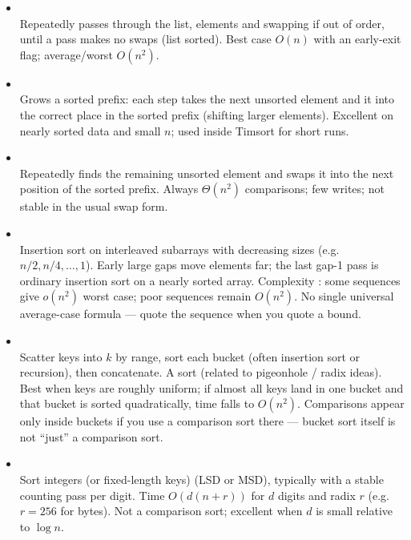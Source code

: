 \begin{itemize}
    \item \href{https://en.wikipedia.org/wiki/Bubble_sort}{} \\
    Repeatedly passes through the list,  elements and 
    swapping if out of order, until a pass makes no swaps (list sorted). Best case $O(n)$ 
    with an early-exit flag; average/worst $O(n^2)$.
    
    \item \href{https://en.wikipedia.org/wiki/Insertion_sort}{} \\
    Grows a sorted prefix: each step takes the next unsorted element and 
     it into the correct place in the sorted prefix (shifting larger 
    elements). Excellent on nearly sorted data and small $n$; used inside Timsort for short runs.
    
    \item \href{https://en.wikipedia.org/wiki/Selection_sort}{} \\
    Repeatedly finds the  remaining unsorted element and swaps it 
    into the next position of the sorted prefix. Always $\Theta(n^2)$ comparisons; 
    few writes; not stable in the usual swap form.
    
    \item \href{https://en.wikipedia.org/wiki/Shellsort}{} \\
    Insertion sort on interleaved subarrays with decreasing  sizes 
    (e.g.\ $n/2, n/4, \ldots, 1$). Early large gaps move elements far; the last gap-1 
    pass is ordinary insertion sort on a nearly sorted array. 
    Complexity : some sequences give 
    $o(n^2)$ worst case; poor sequences remain $O(n^2)$. No single universal 
    average-case formula --- quote the sequence when you quote a bound.
    
    \item \href{https://en.wikipedia.org/wiki/Bucket_sort}{} \\
    Scatter keys into $k$  by range, sort each bucket 
    (often insertion sort or recursion), then concatenate. A  
    sort (related to pigeonhole / radix ideas). Best when keys are roughly uniform; 
    if almost all keys land in one bucket and that bucket is sorted quadratically, 
    time falls to $O(n^2)$. Comparisons appear only inside buckets if you use a 
    comparison sort there --- bucket sort itself is not ``just'' a comparison sort.
    
    \item \href{https://en.wikipedia.org/wiki/Radix_sort}{} \\
    Sort integers (or fixed-length keys)  
    (LSD or MSD), typically with a stable counting pass per digit. 
    Time $O(d(n+r))$ for $d$ digits and radix $r$ (e.g.\ $r=256$ for bytes). 
    Not a comparison sort; excellent when $d$ is small relative to $\log n$.

\end{itemize}

